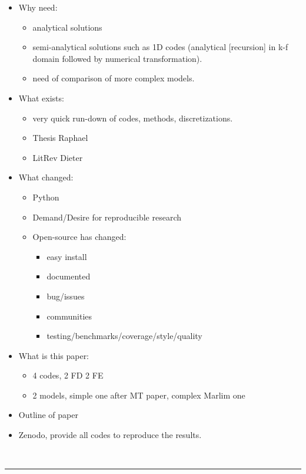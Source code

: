 \documentclass[
    paper,
  ]{geophysics}
\begin{document}
\begin{itemize}
  \item Why need:
    \begin{itemize}
      \item analytical solutions
      \item semi-analytical solutions such as 1D codes (analytical [recursion]
        in k-f domain followed by numerical transformation).
      \item need of comparison of more complex models.
    \end{itemize}
  \item What exists:
    \begin{itemize}
      \item very quick run-down of codes, methods, discretizations.
      \item Thesis Raphael
      \item LitRev Dieter
    \end{itemize}
  \item What changed:
    \begin{itemize}
      \item Python
      \item Demand/Desire for reproducible research
      \item Open-source has changed:
        \begin{itemize}
          \item easy install
          \item documented
          \item bug/issues
          \item communities
          \item testing/benchmarks/coverage/style/quality
        \end{itemize}
    \end{itemize}
  \item What is this paper:
    \begin{itemize}
      \item 4 codes, 2 FD 2 FE
      \item 2 models, simple one after MT paper, complex Marlim one
    \end{itemize}
  \item Outline of paper
  \item Zenodo, provide all codes to reproduce the results.
\end{itemize}


~\\ \hrule
\end{document}

